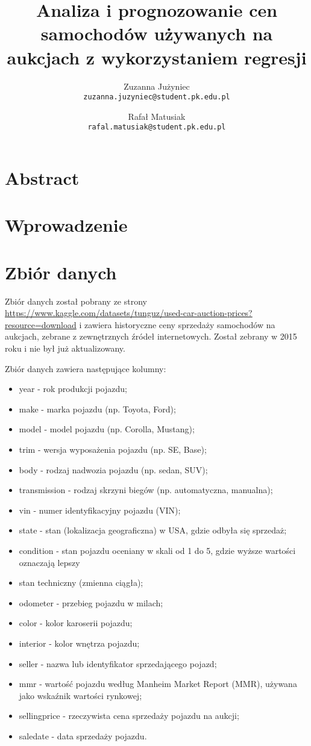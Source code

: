 \documentclass[10pt,letterpaper]{article}
\begin{document}
\title{Analiza i prognozowanie cen samochodów używanych na aukcjach z wykorzystaniem regresji}

\author{Zuzanna Jużyniec\\
{\tt\small zuzanna.juzyniec@student.pk.edu.pl}
\and
Rafał Matusiak\\
{\tt\small rafal.matusiak@student.pk.edu.pl}
}
\maketitle

\section{Abstract}
\section{Wprowadzenie}

\newpage
\section{Zbiór danych}
Zbiór danych został pobrany ze strony \url{https://www.kaggle.com/datasets/tunguz/used-car-auction-prices?resource=download} i zawiera historyczne ceny sprzedaży samochodów na aukcjach, zebrane z zewnętrznych źródeł internetowych. Został zebrany w 2015 roku i nie był już aktualizowany.

Zbiór danych zawiera następujące kolumny:
\begin{itemize}
\item year - rok produkcji pojazdu;
\item make - marka pojazdu (np. Toyota, Ford);
\item model - model pojazdu (np. Corolla, Mustang);
\item trim - wersja wyposażenia pojazdu (np. SE, Base);
\item body - rodzaj nadwozia pojazdu (np. sedan, SUV);
\item transmission - rodzaj skrzyni biegów (np. automatyczna, manualna);
\item vin - numer identyfikacyjny pojazdu (VIN);
\item state - stan (lokalizacja geograficzna) w USA, gdzie odbyła się sprzedaż;
\item condition - stan pojazdu oceniany w skali od 1 do 5, gdzie wyższe wartości oznaczają lepszy \item stan techniczny (zmienna ciągła);
\item odometer - przebieg pojazdu w milach;
\item color - kolor karoserii pojazdu;
\item interior - kolor wnętrza pojazdu;
\item seller - nazwa lub identyfikator sprzedającego pojazd;
\item mmr - wartość pojazdu według Manheim Market Report (MMR), używana jako wskaźnik wartości rynkowej;
\item sellingprice - rzeczywista cena sprzedaży pojazdu na aukcji;
\item saledate - data sprzedaży pojazdu.
\end{itemize}
\end{document}
